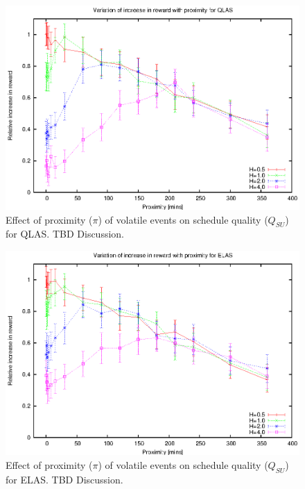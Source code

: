 \begin{figure}[htbp]
\begin{center}
    \includegraphics[scale=1.0, angle=0]{figures/vdv.eps}
\end{center}
\caption[Effect of proximity ($\pi$) of volatile events on schedule quality ($Q_{SU}$) for QLAS.]
{Effect of proximity ($\pi$) of volatile events on schedule quality ($Q_{SU}$) for QLAS. TBD Discussion.}
\label{fig:vol_qlas_pi}
\end{figure}


\begin{figure}[htbp]
\begin{center}
    \includegraphics[scale=1.0, angle=0]{figures/edv.eps}
\end{center}
\caption[Effect of proximity ($\pi$) of volatile events on schedule quality ($Q_{SU}$) for ELAS.]
{Effect of proximity ($\pi$) of volatile events on schedule quality ($Q_{SU}$) for ELAS. TBD Discussion.}
\label{fig:vol_elas_pi}
\end{figure}

